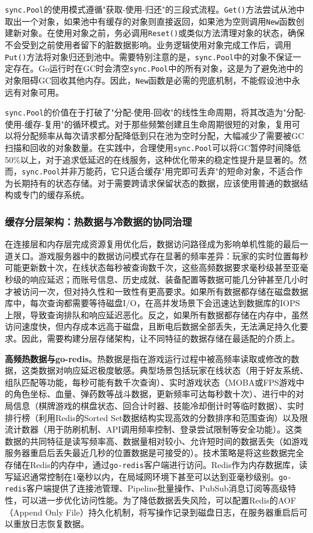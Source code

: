 \texttt{sync.Pool}的使用模式遵循"获取-使用-归还"的三段式流程。\texttt{Get()}方法尝试从池中取出一个对象，如果池中有缓存的对象则直接返回，如果池为空则调用\texttt{New}函数创建新对象。在使用对象之前，务必调用\texttt{Reset()}或类似方法清理对象的状态，确保不会受到之前使用者留下的脏数据影响。业务逻辑使用对象完成工作后，调用\texttt{Put()}方法将对象归还到池中。需要特别注意的是，\texttt{sync.Pool}中的对象不保证一定存在。Go运行时在GC时会清空\texttt{sync.Pool}中的所有对象，这是为了避免池中的对象阻碍GC回收其他内存。因此，\texttt{New}函数是必需的兜底机制，不能假设池中永远有对象可用。

\texttt{sync.Pool}的价值在于打破了"分配-使用-回收"的线性生命周期，将其改造为"分配-使用-缓存-复用"的循环模式。对于那些频繁创建且生命周期很短的对象，复用可以将分配频率从每次请求都分配降低到只在池为空时分配，大幅减少了需要被GC扫描和回收的对象数量。在实践中，合理使用\texttt{sync.Pool}可以将GC暂停时间降低50\%以上，对于追求低延迟的在线服务，这种优化带来的稳定性提升是显著的。然而，\texttt{sync.Pool}并非万能药，它只适合缓存"用完即可丢弃"的短命对象，不适合作为长期持有的状态存储。对于需要跨请求保留状态的数据，应该使用普通的数据结构或专门的缓存系统。

\subsubsection{缓存分层架构：热数据与冷数据的协同治理}

在连接层和内存层完成资源复用优化后，数据访问路径成为影响单机性能的最后一道关口。游戏服务器中的数据访问模式存在显著的频率差异：玩家的实时位置每秒可能更新数十次，在线状态每秒被查询数千次，这些高频数据要求毫秒级甚至亚毫秒级的响应延迟；而账号信息、历史成就、装备配置等数据可能几分钟甚至几小时才被访问一次，但对持久性和一致性有更高要求。如果所有数据都存储在磁盘数据库中，每次查询都需要等待磁盘I/O，在高并发场景下会迅速达到数据库的IOPS上限，导致查询排队和响应延迟恶化。反之，如果所有数据都存储在内存中，虽然访问速度快，但内存成本远高于磁盘，且断电后数据全部丢失，无法满足持久化要求。因此，需要构建分层存储架构，让不同特征的数据存储在最适配的介质上。

\textbf{高频热数据与go-redis}。热数据是指在游戏运行过程中被高频率读取或修改的数据，这类数据对响应延迟极度敏感。典型场景包括玩家在线状态（用于好友系统、组队匹配等功能，每秒可能有数千次查询）、实时游戏状态（MOBA或FPS游戏中的角色坐标、血量、弹药数等战斗数据，更新频率可达每秒数十次）、进行中的对局信息（棋牌游戏的棋盘状态、回合计时器、技能冷却倒计时等临时数据）、实时排行榜（利用Redis的Sorted Set数据结构实现高效的分数排序和范围查询）以及限流计数器（用于防刷机制、API调用频率控制、登录尝试限制等安全功能）。这类数据的共同特征是读写频率高、数据量相对较小、允许短时间的数据丢失（如游戏服务器重启后丢失最近几秒的位置数据是可接受的）。技术策略是将这些数据完全存储在Redis的内存中，通过\texttt{go-redis}客户端进行访问。Redis作为内存数据库，读写延迟通常控制在1毫秒以内，在局域网环境下甚至可以达到亚毫秒级别。\texttt{go-redis}客户端提供了连接池管理、Pipeline批量操作、PubSub消息订阅等高级特性，可以进一步优化访问性能。为了降低数据丢失风险，可以配置Redis的AOF（Append Only File）持久化机制，将写操作记录到磁盘日志，在服务器重启后可以重放日志恢复数据。

